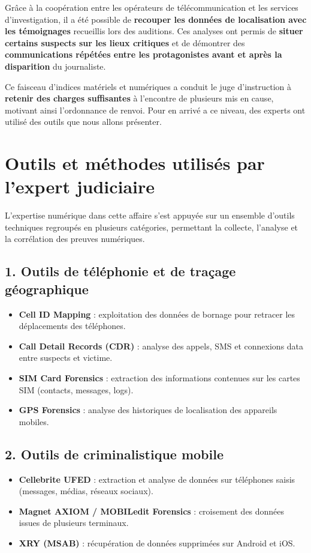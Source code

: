 \documentclass[memoire, 12pt]{report}
\begin{document}
Grâce à la coopération entre les opérateurs de télécommunication et les services d’investigation, il a été possible de \textbf{recouper les données de localisation avec les témoignages} recueillis lors des auditions. Ces analyses ont permis de \textbf{situer certains suspects sur les lieux critiques} et de démontrer des \textbf{communications répétées entre les protagonistes avant et après la disparition} du journaliste.

Ce faisceau d’indices matériels et numériques a conduit le juge d’instruction à \textbf{retenir des charges suffisantes} à l’encontre de plusieurs mis en cause, motivant ainsi l’ordonnance de renvoi. Pour en arrivé a ce niveau, des experts ont utilisé des outils que nous allons présenter.

\vspace{0.5cm}

\section{Outils et méthodes utilisés par l’expert judiciaire}

L’expertise numérique dans cette affaire s’est appuyée sur un ensemble d’outils techniques regroupés en plusieurs catégories, permettant la collecte, l’analyse et la corrélation des preuves numériques.

\subsection*{1. Outils de téléphonie et de traçage géographique}
\begin{itemize}
    \item \textbf{Cell ID Mapping} : exploitation des données de bornage pour retracer les déplacements des téléphones.
    \item \textbf{Call Detail Records (CDR)} : analyse des appels, SMS et connexions data entre suspects et victime.
    \item \textbf{SIM Card Forensics} : extraction des informations contenues sur les cartes SIM (contacts, messages, logs).
    \item \textbf{GPS Forensics} : analyse des historiques de localisation des appareils mobiles.
\end{itemize}

\subsection*{2. Outils de criminalistique mobile}
\begin{itemize}
    \item \textbf{Cellebrite UFED} : extraction et analyse de données sur téléphones saisis (messages, médias, réseaux sociaux).
    \item \textbf{Magnet AXIOM / MOBILedit Forensics} : croisement des données issues de plusieurs terminaux.
    \item \textbf{XRY (MSAB)} : récupération de données supprimées sur Android et iOS.
\end{itemize}
\end{document}
